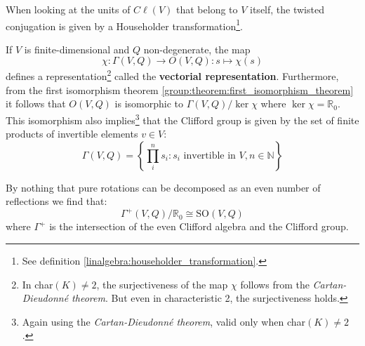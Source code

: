 	\begin{property}
		When looking at the units of $C\ell(V)$ that belong to $V$ itself, the twisted conjugation is given by a Householder transformation\footnote{See definition \ref{linalgebra:householder_transformation}.}.
	\end{property}
	
	\begin{property}
		If $V$ is finite-dimensional and $Q$ non-degenerate, the map
		\begin{equation}
			\chi:\Gamma(V, Q)\rightarrow O(V, Q): s\mapsto\chi(s)
		\end{equation}
		defines a representation\footnote{In char$(K)\neq2$, the surjectiveness of the map $\chi$ follows from the \textit{Cartan-Dieudonn\'e theorem}. But even in characteristic 2, the surjectiveness holds.} called the \textbf{vectorial representation}. Furthermore, from the first isomorphism theorem \ref{group:theorem:first_isomorphism_theorem} it follows that $O(V, Q)$ is isomorphic to $\Gamma(V, Q)/\ker\chi$ where $\ker\chi = \mathbb{R}_0$. This isomorphism also implies\footnote{Again using the \textit{Cartan-Dieudonn\'e theorem}, valid only when char$(K)\neq2$.} that the Clifford group is given by the set of finite products of invertible elements $v\in V$:
		\begin{equation}
			\Gamma(V, Q) = \left\{\prod_i^n s_i : s_i\text{ invertible in }V, n\in\mathbb{N}\right\}
		\end{equation}
	\end{property}
	\begin{result}
		By nothing that pure rotations can be decomposed as an even number of reflections we find that:
		\begin{equation}
			\Gamma^+(V, Q)/\mathbb{R}_0 \cong \text{SO}(V, Q)
		\end{equation}
		where $\Gamma^+$ is the intersection of the even Clifford algebra and the Clifford group.
	\end{result}

